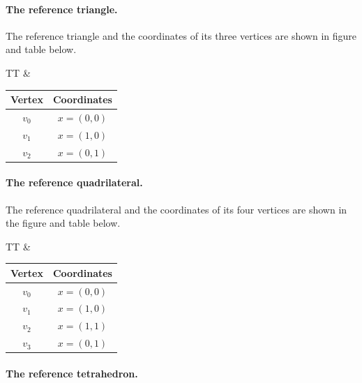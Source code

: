 \paragraph{The reference triangle.}

The reference triangle and the coordinates of its three vertices are
shown in figure and table below.

\begin{center}
\bwfig
  \begin{tabular}{TT}
    &
    \begin{tabular}{cc}
      \toprule
      Vertex & Coordinates \\
      \hline
      $v_0$ & $x = (0, 0)$ \\
      $v_1$ & $x = (1, 0)$ \\
      $v_2$ & $x = (0, 1)$ \\
      \bottomrule
    \end{tabular}
  \end{tabular}
\end{center}

\paragraph{The reference quadrilateral.}

The reference quadrilateral and the coordinates of its four vertices
are shown in the figure and table below.

\begin{center}
\bwfig
  \begin{tabular}{TT}
    &
    \begin{tabular}{cc}
      \toprule
      Vertex & Coordinates \\
      \hline
      $v_0$ & $x = (0, 0)$ \\
      $v_1$ & $x = (1, 0)$ \\
      $v_2$ & $x = (1, 1)$ \\
      $v_3$ & $x = (0, 1)$ \\
      \bottomrule
    \end{tabular}
  \end{tabular}
\end{center}

\paragraph{The reference tetrahedron.}

